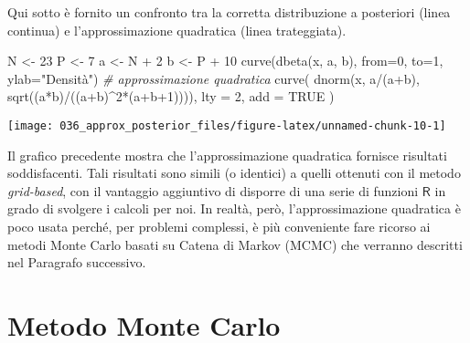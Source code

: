 \documentclass[
]{memoir}
\newenvironment{Shaded}{\begin{snugshade}}{\end{snugshade}}
\newcommand{\AttributeTok}[1]{\textcolor[rgb]{0.77,0.63,0.00}{#1}}
\newcommand{\CommentTok}[1]{\textcolor[rgb]{0.56,0.35,0.01}{\textit{#1}}}
\newcommand{\ConstantTok}[1]{\textcolor[rgb]{0.00,0.00,0.00}{#1}}
\newcommand{\DecValTok}[1]{\textcolor[rgb]{0.00,0.00,0.81}{#1}}
\newcommand{\FunctionTok}[1]{\textcolor[rgb]{0.00,0.00,0.00}{#1}}
\newcommand{\NormalTok}[1]{#1}
\newcommand{\OtherTok}[1]{\textcolor[rgb]{0.56,0.35,0.01}{#1}}
\newcommand{\SpecialCharTok}[1]{\textcolor[rgb]{0.00,0.00,0.00}{#1}}
\newcommand{\StringTok}[1]{\textcolor[rgb]{0.31,0.60,0.02}{#1}}
\newcommand{\R}{\textsf{R}} %
\begin{document}
Qui sotto è fornito un confronto tra la corretta distribuzione a posteriori (linea continua) e l'approssimazione quadratica (linea trateggiata).

\begin{Shaded}
\begin{Highlighting}[]
\NormalTok{N }\OtherTok{\textless{}{-}} \DecValTok{23}
\NormalTok{P }\OtherTok{\textless{}{-}} \DecValTok{7}
\NormalTok{a }\OtherTok{\textless{}{-}}\NormalTok{ N }\SpecialCharTok{+} \DecValTok{2}
\NormalTok{b }\OtherTok{\textless{}{-}}\NormalTok{ P }\SpecialCharTok{+} \DecValTok{10}
\FunctionTok{curve}\NormalTok{(}\FunctionTok{dbeta}\NormalTok{(x, a, b), }\AttributeTok{from=}\DecValTok{0}\NormalTok{, }\AttributeTok{to=}\DecValTok{1}\NormalTok{, }\AttributeTok{ylab=}\StringTok{"Densità"}\NormalTok{)}
\CommentTok{\# approssimazione quadratica}
\FunctionTok{curve}\NormalTok{(}
  \FunctionTok{dnorm}\NormalTok{(x, a}\SpecialCharTok{/}\NormalTok{(a}\SpecialCharTok{+}\NormalTok{b), }\FunctionTok{sqrt}\NormalTok{((a}\SpecialCharTok{*}\NormalTok{b)}\SpecialCharTok{/}\NormalTok{((a}\SpecialCharTok{+}\NormalTok{b)}\SpecialCharTok{\^{}}\DecValTok{2}\SpecialCharTok{*}\NormalTok{(a}\SpecialCharTok{+}\NormalTok{b}\SpecialCharTok{+}\DecValTok{1}\NormalTok{)))),}
  \AttributeTok{lty =} \DecValTok{2}\NormalTok{,}
  \AttributeTok{add =} \ConstantTok{TRUE}
\NormalTok{)}
\end{Highlighting}
\end{Shaded}

\begin{center}\texttt{[image: 036\_approx\_posterior\_files/figure-latex/unnamed-chunk-10-1]} \end{center}

Il grafico precedente mostra che l'approssimazione quadratica fornisce risultati soddisfacenti. Tali risultati sono simili (o identici) a quelli ottenuti con il metodo \emph{grid-based}, con il vantaggio aggiuntivo di disporre di una serie di funzioni \(\R\) in grado di svolgere i calcoli per noi. In realtà, però, l'approssimazione quadratica è poco usata perché, per problemi complessi, è più conveniente fare ricorso ai metodi Monte Carlo basati su Catena di Markov (MCMC) che verranno descritti nel Paragrafo successivo.

\hypertarget{chapter-simulazioneMC}{%
\section{Metodo Monte Carlo}\label{chapter-simulazioneMC}}
\end{document}
